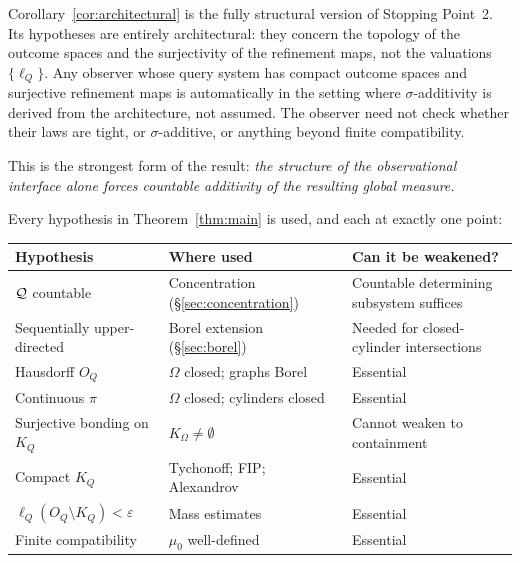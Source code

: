 \begin{remark}
Corollary~\ref{cor:architectural} is the fully structural version
of Stopping Point~2.  Its hypotheses are entirely architectural:
they concern the topology of the outcome spaces and the surjectivity
of the refinement maps, not the valuations $\{\ell_Q\}$.  Any
observer whose query system has compact outcome spaces and surjective
refinement maps is automatically in the setting where
$\sigma$-additivity is derived from the architecture, not assumed.
The observer need not check whether their laws are tight, or
$\sigma$-additive, or anything beyond finite compatibility.

This is the strongest form of the result: \emph{the structure of
the observational interface alone forces countable additivity of the
resulting global measure.}
\end{remark}

\begin{remark}
Every hypothesis in Theorem~\ref{thm:main} is used, and each
at exactly one point:

\begin{center}
\begin{tabular}{llp{5cm}}
\toprule
Hypothesis & Where used & Can it be weakened? \\
\midrule
$\mathcal{Q}$ countable & Concentration (\S\ref{sec:concentration})
  & Countable determining subsystem suffices \\
Sequentially upper-directed & Borel extension (\S\ref{sec:borel})
  & Needed for closed-cylinder intersections \\
Hausdorff $O_Q$ & $\Omega$ closed; graphs Borel
  & Essential \\
Continuous $\pi$ & $\Omega$ closed; cylinders closed
  & Essential \\
Surjective bonding on $K_Q$ & $K_\Omega \neq \emptyset$
  & Cannot weaken to containment \\
Compact $K_Q$ & Tychonoff; FIP; Alexandrov
  & Essential \\
$\ell_Q(O_Q \setminus K_Q) < \varepsilon$ & Mass estimates
  & Essential \\
Finite compatibility & $\mu_0$ well-defined
  & Essential \\
\bottomrule
\end{tabular}
\end{center}
\end{remark}

